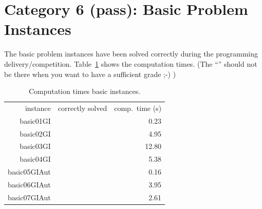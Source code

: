 \documentclass[twoside]{article}
\newcommand{\cmark}{\ding{51}}%
\newcommand{\xmark}{\ding{55}}%
\begin{document}
\section{Category 6 (pass): Basic Problem Instances}
The basic problem instances have been solved correctly during the programming delivery/competition. Table~\ref{tab:basic} shows the computation times. (The ``\xmark''  should not be there when you want to have a sufficient grade ;-) )
\begin{table}[h]
\centering
\begin{tabular}{r|c|r}
instance&correctly solved& comp.\ time (s)\\
\noalign{\smallskip}\hline\hline\noalign{\smallskip}
basic01GI& \cmark & 0.23\\
basic02GI& \cmark & 4.95\\
basic03GI& \cmark & 12.80\\
basic04GI& \cmark & 5.38\\
basic05GIAut& \cmark & 0.16\\
basic06GIAut& \cmark & 3.95\\
basic07GIAut& \cmark & 2.61\\
\end{tabular}
\caption{Computation times basic instances.}\label{tab:basic}
\end{table}

\vspace{-1ex}
\end{document}

